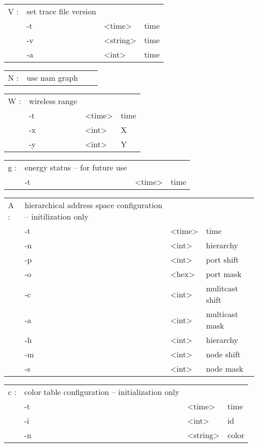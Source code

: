   \begin{tabular}{llll}
  V : & set trace file version & & \\
    &  -t & <time> & time \\
    &  -v & <string> & time \\
    &  -a & <int> & time \\
  \end{tabular}

  \begin{tabular}{llll}
  N : & use nam graph & & \\
  \end{tabular}

  \begin{tabular}{llll}
  W : & wireless range & & \\
    &  -t & <time> & time \\
    &  -x & <int> & X \\
    &  -y & <int> & Y \\
  \end{tabular}

  \begin{tabular}{llll}
  g : & energy status -- for future use & & \\
    &  -t & <time> & time \\
  \end{tabular}

  \begin{tabular}{llll}
  A : & hierarchical address space configuration -- initilization only & & \\
    &  -t & <time> & time \\
    &  -n & <int> & hierarchy \\
    &  -p & <int> & port shift \\
    &  -o & <hex> & port mask \\
    &  -c & <int> & mulitcast shift \\
    &  -a & <int> & multicast mask \\
    &  -h & <int> & hierarchy \\
    &  -m & <int> & node shift \\
    &  -s & <int> & node mask \\
  \end{tabular}

  \begin{tabular}{llll}
  c : & color table configuration -- initialization only & & \\
    &  -t & <time> & time \\
    &  -i & <int> & id \\
    &  -n & <string> & color \\
  \end{tabular}

